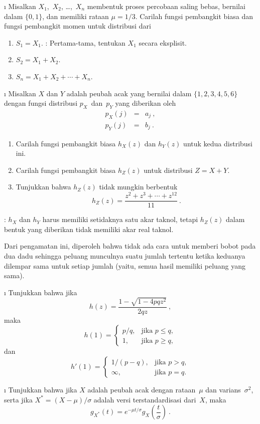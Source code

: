 \begin{LJSItem}
\i\label{exer 10.1.8} Misalkan $X_1$,~$X_2$, \ldots,~$X_n$ membentuk proses percobaan 
saling bebas, bernilai dalam $\{0,1\}$, dan memiliki rataan $\mu = 1/3$.  Carilah fungsi pembangkit biasa dan 
fungsi pembangkit momen untuk distribusi dari
\begin{enumerate}
\item $S_1 = X_1$. : Pertama-tama, tentukan $X_1$ secara eksplisit.

\item $S_2 = X_1 + X_2$.

\item $S_n = X_1 + X_2 +\cdots+ X_n$.
\end{enumerate}

\i\label{exer 10.1.9} Misalkan $X$ dan $Y$ adalah peubah acak yang bernilai dalam 
$\{1,2,3,4,5,6\}$ dengan fungsi distribusi $p_X$~dan~$p_Y$ yang diberikan oleh
\begin{eqnarray*}
p_X(j) &=& a_j\ , \\
p_Y(j) &=& b_j\ .
\end{eqnarray*} 
\begin{enumerate}
\item Carilah fungsi pembangkit biasa $h_X(z)$ dan $h_Y(z)$ untuk kedua
distribusi ini.

\item Carilah fungsi pembangkit biasa $h_Z(z)$ untuk distribusi $Z = X
+ Y$.

\item Tunjukkan bahwa $h_Z(z)$ tidak mungkin berbentuk
$$
h_Z(z) = \frac{z^2 + z^3 +\cdots+ z^{12}}{11}\ .
$$
\end{enumerate}
\noindent {}: $h_X$ dan $h_Y$ harus memiliki setidaknya satu akar taknol, tetapi 
$h_Z(z)$ dalam bentuk yang diberikan tidak memiliki akar real taknol.

Dari pengamatan ini, diperoleh bahwa tidak ada cara untuk memberi bobot pada dua dadu sehingga
peluang munculnya suatu jumlah tertentu ketika keduanya dilempar sama
untuk setiap jumlah (yaitu, semua hasil memiliki peluang yang sama).

\i\label{exer 10.1.10} Tunjukkan bahwa jika
$$
h(z) = \frac{1 - \sqrt{1 - 4pqz^2}}{2qz}\ ,
$$
maka
$$
 h(1) = \left \{ \begin{array}{ll}
               p/q, &  \mbox{jika $p \leq q,$}  \\
                 1, &  \mbox{jika $p \geq q,$} \end{array}\right.
$$
dan
$$
 h'(1) = \left \{ \begin{array}{ll}
                1/(p - q), &  \mbox{jika $p > q,$}\\
                   \infty, &  \mbox{jika $p = q.$} \end{array}\right.
$$

\i\label{exer 10.1.14} Tunjukkan bahwa jika $X$ adalah peubah acak dengan rataan~$\mu$
dan varians~$\sigma^2$, serta jika $X^* = (X - \mu)/\sigma$ adalah versi
terstandardisasi dari~$X$, maka
$$
g_{X^*}(t) = e^{-\mu t/\sigma} g_X\left( \frac t\sigma \right)\ .
$$
\end{LJSItem}

